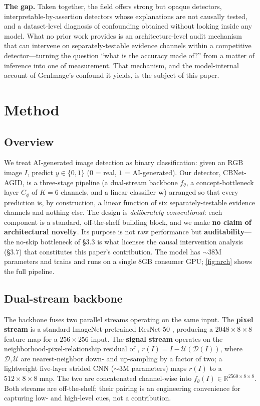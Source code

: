 \textbf{The gap.} Taken together, the field offers strong but opaque detectors, interpretable-by-assertion detectors whose explanations are not causally tested, and a dataset-level diagnosis of confounding obtained without looking inside any model. What no prior work provides is an architecture-level audit mechanism that can intervene on separately-testable evidence channels within a competitive detector---turning the question ``what is the accuracy made of?'' from a matter of inference into one of measurement. That mechanism, and the model-internal account of GenImage's confound it yields, is the subject of this paper.

\section{Method}

\subsection{Overview}

We treat AI-generated image detection as binary classification: given an RGB image \(I\), predict \(y\in\{0,1\}\) (\(0\) = real, \(1\) = AI-generated). Our detector, CBNet-AGID, is a three-stage pipeline (a dual-stream backbone \(f_\theta\), a concept-bottleneck layer \(C_\phi\) of \(K{=}6\) channels, and a linear classifier \(\mathbf{w}\)) arranged so that every prediction is, by construction, a linear function of six separately-testable evidence channels and nothing else. The design is \emph{deliberately conventional}: each component is a standard, off-the-shelf building block, and we make \textbf{no claim of architectural novelty}. Its purpose is not raw performance but \textbf{auditability}---the no-skip bottleneck of \S{}3.3 is what licenses the causal intervention analysis (\S{}3.7) that constitutes this paper's contribution. The model has \ensuremath{\sim}38M parameters and trains and runs on a single 8GB consumer GPU; \autoref{fig:arch} shows the full pipeline.



\subsection{Dual-stream backbone}

The backbone fuses two parallel streams operating on the same input. The \textbf{pixel stream} is a standard ImageNet-pretrained ResNet-50 \citep{he2016resnet}, producing a \(2048\times8\times8\) feature map for a \(256\times256\) input. The \textbf{signal stream} operates on the neighborhood-pixel-relationship residual of \citet{tan2024npr}, \(r(I)=I-\mathcal{U}(\mathcal{D}(I))\), where \(\mathcal{D},\mathcal{U}\) are nearest-neighbor down- and up-sampling by a factor of two; a lightweight five-layer strided CNN (\ensuremath{\sim}3M parameters) maps \(r(I)\) to a \(512\times8\times8\) map. The two are concatenated channel-wise into \(f_\theta(I)\in\mathbb{R}^{2560\times8\times8}\). Both streams are off-the-shelf; their pairing is an engineering convenience for capturing low- and high-level cues, not a contribution.

